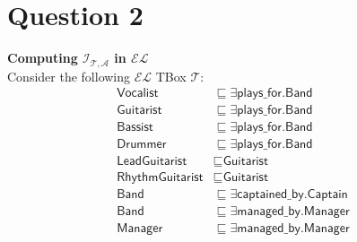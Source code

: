 \documentclass{article}
\begin{document}
    \section{Question 2}
    \textbf{Computing $\mathcal{I}_{\mathcal{T},\mathcal{A}}$ in $\mathcal{EL}$}\\
    Consider the following $\mathcal{EL}$ TBox $\mathcal{T}$:
    \begin{align*}
        \textsf{Vocalist} & \sqsubseteq \exists\textsf{plays\_for.Band}\\
        \textsf{Guitarist} & \sqsubseteq \exists\textsf{plays\_for.Band}\\
        \textsf{Bassist} & \sqsubseteq \exists\textsf{plays\_for.Band}\\
        \textsf{Drummer} & \sqsubseteq \exists\textsf{plays\_for.Band}\\
        \textsf{LeadGuitarist} & \sqsubseteq\textsf{Guitarist}\\
        \textsf{RhythmGuitarist} & \sqsubseteq\textsf{Guitarist}\\
        \textsf{Band} & \sqsubseteq\exists\textsf{captained\_by.Captain}\\
        \textsf{Band} & \sqsubseteq\exists\textsf{managed\_by.Manager}\\
        \textsf{Manager} & \sqsubseteq \exists\textsf{managed\_by.Manager}
    \end{align*}
\end{document}

